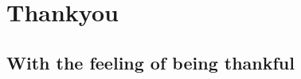 \newpage
\centering \section*{Thankyou}
\centering \subsection*{With the feeling of being thankful}
 \begin{figure}[htbp!]
    \centering
        \caption{}
        \label{fig:namaste}
    \end{figure}
\FloatBarrier




